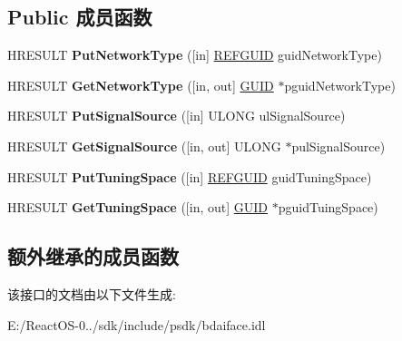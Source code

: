 \subsection*{Public 成员函数}
\begin{DoxyCompactItemize}
\item 
\mbox{\label{interface_i_b_d_a___signal_properties_a5ff26e6340e98d5d3d584544da576415}} 
H\+R\+E\+S\+U\+LT {\bfseries Put\+Network\+Type} (\mbox{[}in\mbox{]} \hyperlink{struct___g_u_i_d}{R\+E\+F\+G\+U\+ID} guid\+Network\+Type)
\item 
\mbox{\label{interface_i_b_d_a___signal_properties_aef5aeede0017f1dd43400622886dfcba}} 
H\+R\+E\+S\+U\+LT {\bfseries Get\+Network\+Type} (\mbox{[}in, out\mbox{]} \hyperlink{interface_g_u_i_d}{G\+U\+ID} $\ast$pguid\+Network\+Type)
\item 
\mbox{\label{interface_i_b_d_a___signal_properties_a8c1a6a891c4544f9636fcb45725b8606}} 
H\+R\+E\+S\+U\+LT {\bfseries Put\+Signal\+Source} (\mbox{[}in\mbox{]} U\+L\+O\+NG ul\+Signal\+Source)
\item 
\mbox{\label{interface_i_b_d_a___signal_properties_a396c9d9ef8b781c0253bab3ced3e4d38}} 
H\+R\+E\+S\+U\+LT {\bfseries Get\+Signal\+Source} (\mbox{[}in, out\mbox{]} U\+L\+O\+NG $\ast$pul\+Signal\+Source)
\item 
\mbox{\label{interface_i_b_d_a___signal_properties_aa83bcc35d8580148c5dd6cde1bb9862e}} 
H\+R\+E\+S\+U\+LT {\bfseries Put\+Tuning\+Space} (\mbox{[}in\mbox{]} \hyperlink{struct___g_u_i_d}{R\+E\+F\+G\+U\+ID} guid\+Tuning\+Space)
\item 
\mbox{\label{interface_i_b_d_a___signal_properties_a0a93ff032de23d7f0116d8b4486aa56a}} 
H\+R\+E\+S\+U\+LT {\bfseries Get\+Tuning\+Space} (\mbox{[}in, out\mbox{]} \hyperlink{interface_g_u_i_d}{G\+U\+ID} $\ast$pguid\+Tuing\+Space)
\end{DoxyCompactItemize}
\subsection*{额外继承的成员函数}


该接口的文档由以下文件生成\+:\begin{DoxyCompactItemize}
\item 
E\+:/\+React\+O\+S-\/0../sdk/include/psdk/bdaiface.\+idl\end{DoxyCompactItemize}
